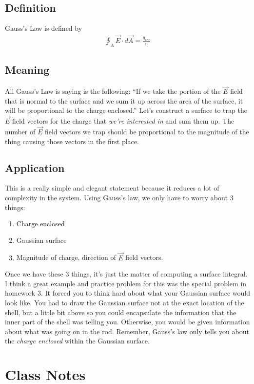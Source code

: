 \documentclass[12pt]{extreport}
\begin{document}
\section{Definition}
Gauss's Law is defined by
	\begin{align}
		\oint_A \vec E \cdot d \vec A = \frac{q_{enc}}{\epsilon_0}
	\end{align}
	
\section{Meaning}
All Gauss's Law is saying is the following: ``If we take the portion of the $\vec E$ field that is normal to the surface and we sum it up across the area of the surface, it will be proportional to the charge enclosed.'' Let's construct a surface to trap the $\vec E$ field vectors for the charge that \textit{we're interested in} and sum them up. The number of $\vec E$ field vectors we trap should be proportional to the magnitude of the thing causing those vectors in the first place.

\section{Application}
This is a really simple and elegant statement because it reduces a lot of complexity in the system. Using Gauss's law, we only have to worry about 3 things: 
	\begin{enumerate}
		\item Charge enclosed
		\item Gaussian surface
		\item Magnitude of charge, direction of $\vec E$ field vectors.
	\end{enumerate}
Once we have these 3 things, it's just the matter of computing a surface integral. I think a great example and practice problem for this was the special problem in homework 3. It forced you to think hard about what your Gaussian surface would look like. You had to draw the Gaussian surface not at the exact location of the shell, but a little bit above so you could encapsulate the information that the inner part of the shell was telling you. Otherwise, you would be given information about what was going on in the rod. Remember, Gauss's law only tells you about the \textit{charge enclosed} within the Gaussian surface.

\chapter{Class Notes}
\end{document}
